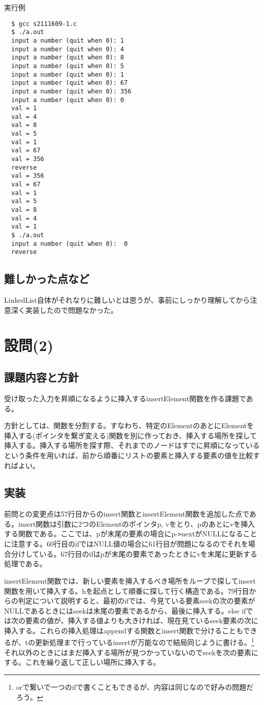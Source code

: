 \documentclass[dvipdfmx,12pt,a4j]{jarticle}
\begin{document}
\begin{itembox}[l]{実行例}
\begin{verbatim}
  $ gcc s2111609-1.c
  $ ./a.out
  input a number (quit when 0): 1
  input a number (quit when 0): 4
  input a number (quit when 0): 8
  input a number (quit when 0): 5
  input a number (quit when 0): 1
  input a number (quit when 0): 67
  input a number (quit when 0): 356
  input a number (quit when 0): 0
  val = 1
  val = 4
  val = 8
  val = 5
  val = 1
  val = 67
  val = 356
  reverse
  val = 356
  val = 67
  val = 1
  val = 5
  val = 8
  val = 4
  val = 1
  $ ./a.out 
  input a number (quit when 0):  0
  reverse
\end{verbatim}
\end{itembox}

\subsection{難しかった点など}
LinkedList自体がそれなりに難しいとは思うが、事前にしっかり理解してから注意深く実装したので問題なかった。

\section{設問(2)}
\subsection{課題内容と方針}
受け取った入力を昇順になるように挿入するinsertElement関数を作る課題である。

方針としては、関数を分割する。すなわち、特定のElementのあとにElementを挿入する(ポインタを繋ぎ変える)関数を別に作っておき、挿入する場所を探して挿入する。挿入する場所を探す際、それまでのノードはすでに昇順になっているという条件を用いれば、前から順番にリストの要素と挿入する要素の値を比較すればよい。

\subsection{実装}
前問との変更点は57行目からのinsert関数とinsertElement関数を追加した点である。insert関数は引数に2つのElementのポインタp, vをとり、pのあとにvを挿入する関数である。ここでは、pが末尾の要素の場合にp-\verb+>+nextがNULLになることに注意する。60行目のifではNULL値の場合に61行目が問題になるのでそれを場合分けしている。67行目のifはpが末尾の要素であったときにvを末尾に更新する処理である。

insertElement関数では、新しい要素を挿入するべき場所をループで探してinsert関数を用いて挿入する。hを起点として順番に探して行く構造である。79行目からの判定について説明すると、最初のifでは、今見ている要素seekの次の要素がNULLであるときにはseekは末尾の要素であるから、最後に挿入する。else ifでは次の要素の値が、挿入する値よりも大きければ、現在見ているseek要素の次に挿入する。これらの挿入処理はappendする関数とinsert関数で分けることもできるが、tの更新処理まで行っているinsertが万能なので結局同じように書ける。\footnote{orで繋いで一つのifで書くこともできるが、内容は同じなので好みの問題だろう。}
それ以外のときにはまだ挿入する場所が見つかっていないのでseekを次の要素にする。これを繰り返して正しい場所に挿入する。
\end{document}
